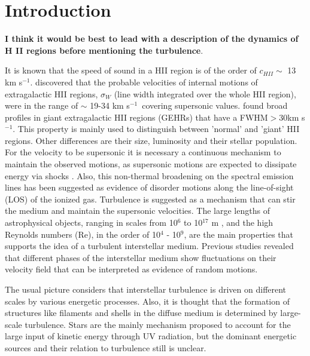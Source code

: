 \documentclass[fleqn,usenatbib, useAMS, a4paper]{mnras}
\newcommand\kms{$^{-1}$}
\begin{document}
\newcommand\WILL[1]{\textbf{\color{WillCommentColor}#1}}


\section{Introduction}



\WILL{I think it would be best to lead with a description of the dynamics of H II regions before mentioning the turbulence}.



It is known that the speed of sound in a HII region is of the order of \(c_{HII} \sim\) 13 km s\kms.
\citet{smith1970} discovered that the probable velocities of internal motions of extragalactic HII regions, \(\sigma_{W}\) (line width integrated over the whole HII region), were in the range of $\sim$ 19-34 km s\kms\ covering supersonic values.
\citet{skillman1984kinematics} found broad profiles in giant extragalactic HII regions (GEHRs) that have a FWHM\(>\)30km s\kms. 
This property is mainly used to distinguish between 'normal' and 'giant' HII regions. Other differences are their size, luminosity and their stellar population. 
For the velocity to be supersonic it is necessary a continuous mechanism to maintain the observed motions, as supersonic motions are expected to dissipate energy via shocks \citep{1994Ap&SS.216..285C}.
Also, this non-thermal broadening on the spectral emission lines has been suggested as evidence of disorder motions along the line-of-sight (LOS) of the ionized gas. 
Turbulence is suggested as a mechanism that can stir the medium and maintain the supersonic velocities. 
The large lengths of astrophysical objects, ranging in scales from 10$^{6}$ to 10$^{17}$ m \citep{2010ApJ...710..853C}, and the high Reynolds numbers (Re), in the order of 10$^{4}$ - 10$^{9}$, are the main properties that supports the idea of a turbulent interstellar medium.
Previous studies \citep{1999intu.conf.....F,2004ARA&A..42..211E,scalo2004interstellar} revealed that different phases of the interstellar medium show fluctuations on their velocity field that can be interpreted as evidence of random motions.

The usual picture considers that interstellar turbulence is driven on different scales by various energetic processes.
Also, it is thought that the formation of structures like filaments and shells in the diffuse medium is determined by large-scale turbulence.
Stars are the mainly mechanism proposed to account for the large input of kinetic energy through UV radiation, but the dominant energetic sources and their relation to turbulence still is unclear.
\end{document}

